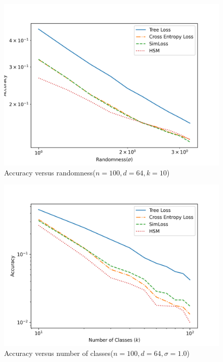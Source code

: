 \documentclass[twoside]{article}
\theoremstyle{definition}
\begin{document}
\begin{figure}[h]
\vspace{.3in}
\includegraphics[width=\linewidth]{fig/images/accuracy_vs_sigma.png}
\vspace{.3in}
\caption{\small Accuracy versus randomness($n=100, d=64, k=10$)}
\label{accuracy_vs_sigma}
\end{figure}

\begin{figure}[h]
\vspace{.3in}
\includegraphics[width=\linewidth]{fig/images/accuracy_vs_class.png}
\vspace{.3in}
\caption{\small Accuracy versus number of classes($n=100, d=64, \sigma=1.0$)}
\label{accuracy_vs_class}
\end{figure} 
\end{document}
